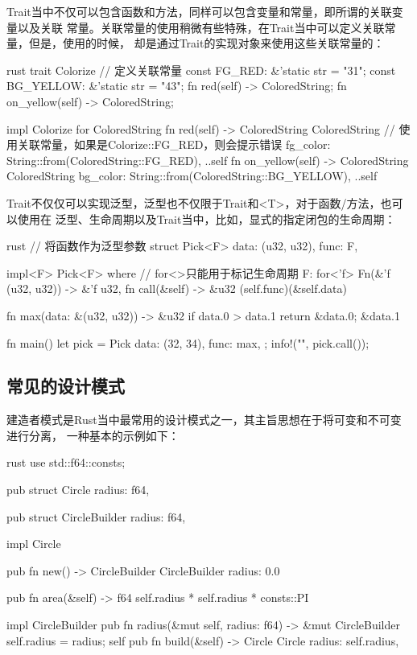 Trait当中不仅可以包含函数和方法，同样可以包含变量和常量，即所谓的关联变量以及关联
常量。关联常量的使用稍微有些特殊，在Trait当中可以定义关联常量，但是，使用的时候，
却是通过Trait的实现对象来使用这些关联常量的：
\begin{code-block}{rust}
trait Colorize {
    // 定义关联常量
    const FG_RED: &'static str = "31";
    const BG_YELLOW: &'static str = "43";
    fn red(self) -> ColoredString;
    fn on_yellow(self) -> ColoredString;
}

impl Colorize for ColoredString {
    fn red(self) -> ColoredString {
        ColoredString {
            // 使用关联常量，如果是Colorize::FG_RED，则会提示错误
            fg_color: String::from(ColoredString::FG_RED),
            ..self
        }
    }
    fn on_yellow(self) -> ColoredString {
        ColoredString {
            bg_color: String::from(ColoredString::BG_YELLOW),
            ..self
        }
    }
}
\end{code-block}

Trait不仅仅可以实现泛型，泛型也不仅限于Trait和<T>，对于函数/方法，也可以使用在
泛型、生命周期以及Trait当中，比如，显式的指定闭包的生命周期：
\begin{code-block}{rust}
// 将函数作为泛型参数
struct Pick<F> {
    data: (u32, u32),
    func: F,
}

impl<F> Pick<F>
where
    // for<>只能用于标记生命周期
    F: for<'f> Fn(&'f (u32, u32)) -> &'f u32,
{
    fn call(&self) -> &u32 {
        (self.func)(&self.data)
    }
}

fn max(data: &(u32, u32)) -> &u32 {
    if data.0 > data.1 {
        return &data.0;
    }
    &data.1
}

fn main() {
    let pick = Pick {
        data: (32, 34),
        func: max,
    };
    info!("{}", pick.call());
}
\end{code-block}

\subsection{常见的设计模式}
建造者模式是Rust当中最常用的设计模式之一，其主旨思想在于将可变和不可变进行分离，
一种基本的示例如下：
\begin{code-block}{rust}
use std::f64::consts;

pub struct Circle {
    radius: f64,
}

pub struct CircleBuilder {
    radius: f64,
}

impl Circle {
    pub fn new() -> CircleBuilder {
        CircleBuilder { radius: 0.0 }
    }

    pub fn area(&self) -> f64 {
        self.radius * self.radius * consts::PI
    }
}

impl CircleBuilder {
    pub fn radius(&mut self, radius: f64) -> &mut CircleBuilder {
        self.radius = radius;
        self
    }
    pub fn build(&self) -> Circle {
        Circle {
            radius: self.radius,
        }
    }
}
\end{code-block}

